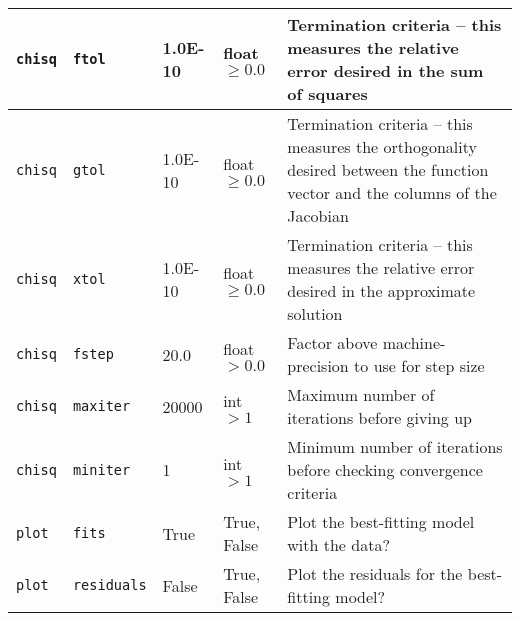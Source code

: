 \begin{center}
\begin{longtable}{p{1.5cm}p{2.5cm}p{2.0cm}p{2.0cm}p{5.0cm}}
\multicolumn{1}{p{1.5cm}}{\texttt{chisq}} &
\multicolumn{1}{p{2.5cm}}{\texttt{ftol}} &
\multicolumn{1}{p{2.0cm}}{1.0E-10} &
\multicolumn{1}{p{2.0cm}}{float $\ge0.0$} &
\multicolumn{1}{p{5.0cm}}{Termination criteria -- this measures the relative error desired in the sum of squares} \\ \midrule

\multicolumn{1}{p{1.5cm}}{\texttt{chisq}} &
\multicolumn{1}{p{2.5cm}}{\texttt{gtol}} &
\multicolumn{1}{p{2.0cm}}{1.0E-10} &
\multicolumn{1}{p{2.0cm}}{float $\ge0.0$} &
\multicolumn{1}{p{5.0cm}}{Termination criteria -- this measures the orthogonality desired between the function vector and the columns of the Jacobian} \\ \midrule

\multicolumn{1}{p{1.5cm}}{\texttt{chisq}} &
\multicolumn{1}{p{2.5cm}}{\texttt{xtol}} &
\multicolumn{1}{p{2.0cm}}{1.0E-10} &
\multicolumn{1}{p{2.0cm}}{float $\ge0.0$} &
\multicolumn{1}{p{5.0cm}}{Termination criteria -- this measures the relative error desired in the approximate solution} \\ \midrule

\multicolumn{1}{p{1.5cm}}{\texttt{chisq}} &
\multicolumn{1}{p{2.5cm}}{\texttt{fstep}} &
\multicolumn{1}{p{2.0cm}}{20.0} &
\multicolumn{1}{p{2.0cm}}{float $>0.0$} &
\multicolumn{1}{p{5.0cm}}{Factor above machine-precision to use for step size} \\ \midrule

\multicolumn{1}{p{1.5cm}}{\texttt{chisq}} &
\multicolumn{1}{p{2.5cm}}{\texttt{maxiter}} &
\multicolumn{1}{p{2.0cm}}{20000} &
\multicolumn{1}{p{2.0cm}}{int $>1$} &
\multicolumn{1}{p{5.0cm}}{Maximum number of iterations before giving up} \\ \midrule

\multicolumn{1}{p{1.5cm}}{\texttt{chisq}} &
\multicolumn{1}{p{2.5cm}}{\texttt{miniter}} &
\multicolumn{1}{p{2.0cm}}{1} &
\multicolumn{1}{p{2.0cm}}{int $>1$} &
\multicolumn{1}{p{5.0cm}}{Minimum number of iterations before checking convergence criteria} \\ \midrule

\multicolumn{1}{p{1.5cm}}{\texttt{plot}} &
\multicolumn{1}{p{2.5cm}}{\texttt{fits}} &
\multicolumn{1}{p{2.0cm}}{True} &
\multicolumn{1}{p{2.0cm}}{True, False} &
\multicolumn{1}{p{5.0cm}}{Plot the best-fitting model with the data?} \\ \midrule

\multicolumn{1}{p{1.5cm}}{\texttt{plot}} &
\multicolumn{1}{p{2.5cm}}{\texttt{residuals}} &
\multicolumn{1}{p{2.0cm}}{False} &
\multicolumn{1}{p{2.0cm}}{True, False} &
\multicolumn{1}{p{5.0cm}}{Plot the residuals for the best-fitting model?} \\ \midrule


\end{longtable}
\end{center}
